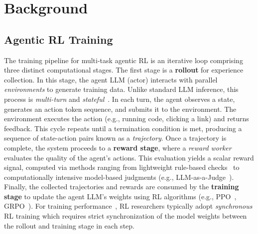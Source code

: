 \section{Background}
\label{sec:background}


\subsection{Agentic RL Training}
\label{subsec:multi-task-agentic}

The training pipeline for multi-task agentic RL is an iterative loop
comprising three distinct computational stages. The first stage is a \textbf
{rollout} for experience collection. In this stage, the agent LLM
(actor) interacts with parallel \emph{environments} to generate training
data. Unlike standard LLM inference, this process is \emph
{multi-turn} and \emph{stateful}~\cite
{kimiteam2025kimik2openagentic,deepseek_v3_2_speciale}. In each turn, the
agent observes a state, generates an action token sequence, and submits it to
the environment. The environment executes the action (e.g., running code,
clicking a link) and returns feedback. This cycle repeats until a termination
condition is met, producing a sequence of state-action pairs known as a \emph
{trajectory}. Once a trajectory is complete, the system proceeds to
a \textbf{reward stage}, where a \emph{reward worker} evaluates the quality
of the agent's actions. This evaluation yields a scalar reward signal,
computed via methods ranging from lightweight rule-based checks~\cite
{he2025deepmath} to computationally intensive model-based judgments
(e.g., LLM-as-a-Judge~\cite
{son2024llmasajudgerewardmodel,zhong2024rlhfuseefficientrlhftraining}).
Finally, the collected trajectories and rewards are consumed by the \textbf
{training stage} to update the agent LLM’s weights using RL algorithms
(e.g., PPO~\cite{schulman2017proximal}, GRPO~\cite{shao2024deepseekmath}). For training performance~\cite{areal}, RL researchers typically adopt \textit{synchronous} RL training which requires strict synchronization of the model weights between the rollout and training stage in each step. 



